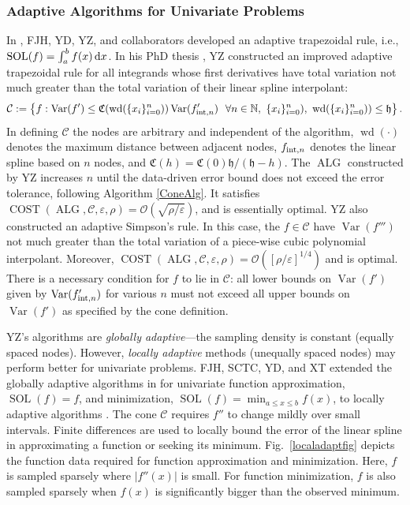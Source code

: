 \documentclass[11pt]{NSFamsart}
\DeclareMathOperator{\cost}{COST}
\DeclareMathOperator{\size}{wd}
\newcommand{\naturals}{{\mathbb{N}}}
\newcommand{\hcut}{\mathfrak{h}}
\DeclareMathOperator{\Var}{Var}
\DeclareMathOperator{\SOL}{SOL}
\DeclareMathOperator{\ALG}{ALG}
\def\dif{\textup{d}}
\newcommand{\cc}{\mathcal{C}}
\newcommand{\fC}{\mathfrak{C}}
\newcommand{\Order}{\mathcal{O}}
\newcommand{\inflate}{\fC}
\begin{document}
\subsubsection{Adaptive Algorithms for Univariate Problems} \label{sec:localadpat}
In \cite{HicEtal14b}, FJH, YD, YZ, and collaborators developed an adaptive trapezoidal rule, i.e., $\SOL(f) = \int_a^b f(x) \, \dif x$.  In his PhD thesis \cite{Zha18a}, YZ constructed an improved adaptive trapezoidal rule for all integrands whose first derivatives have total variation not much greater than the total variation of their linear spline interpolant:
\[
\cc: = \left \{ f : \Var(f') \le \inflate(\size(\{x_i\}_{i=0}^n)) \Var(f'_{\textup{int},n}) \ \ \forall n \in \naturals, \ \{x_i\}_{i=0}^n), \ \size(\{x_i\}_{i=0}^n)) \le \hcut \right\}.
\]
In defining $\cc$ the nodes are arbitrary and independent of the algorithm, $\size(\cdot)$ denotes the maximum distance between adjacent nodes, $f_{\textup{int},n}$ denotes the linear spline based on $n$ nodes, and $\inflate(h) = \inflate(0) \hcut/(\hcut - h)$.  The $\ALG$ constructed by YZ  increases $n$ until the data-driven error bound does not exceed the error tolerance, following Algorithm \ref{ConeAlg}.  It satisfies  $\cost(\ALG,\cc,\varepsilon, \rho) =  \Order(\sqrt{\rho/\varepsilon})$, and is essentially optimal.  YZ also constructed an adaptive Simpson's rule.  In this case, the $f \in \cc$ have $\Var(f''')$ not much greater than the total variation of a piece-wise cubic polynomial interpolant.  Moreover,  $\cost(\ALG,\cc,\varepsilon, \rho) =  \Order([\rho/\varepsilon]^{1/4})$ and is optimal.  There is a necessary condition for $f$ to lie in $\cc$: all lower bounds on $\Var(f')$ given by $\Var(f'_{\textup{int},n})$ for various $n$ must not exceed all upper bounds on $\Var(f')$ as specified by the cone definition.

YZ's algorithms are \emph{globally adaptive}---the sampling density is constant (equally spaced nodes).  However, \emph{locally adaptive} methods (unequally spaced nodes) may perform better for univariate problems.  FJH, SCTC, YD, and XT extended the globally adaptive algorithms in \cite{HicEtal14b,Ton14a} for univariate function approximation, $\SOL(f) = f$, and minimization, $\SOL(f) = \min_{a \le x \le b} f(x)$, to locally adaptive algorithms \cite{ChoEtal17a}.  The cone $\cc$ requires $f''$ to change mildly over small intervals.  Finite differences are used to locally bound the error of the linear spline in approximating a function or seeking its minimum. Fig.\ 
\ref{localadaptfig} depicts the function data required for function approximation and minimization.  Here, $f$ is 
sampled sparsely where $|f''(x)|$ is small. For function minimization, $f$ is also sampled sparsely when $f(x)$ is significantly bigger than the observed minimum.
\end{document}
